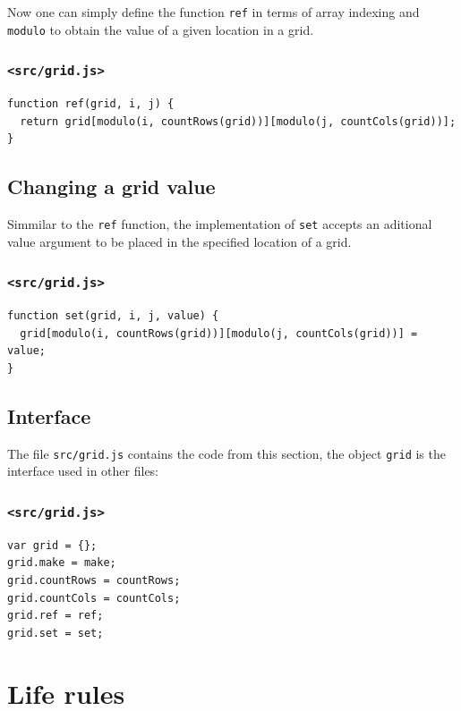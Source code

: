 \documentclass[11pt]{article}
\begin{document}
Now one can simply define the function \texttt{ref} in terms of array indexing and \texttt{modulo} to obtain the value of a given location in a grid.

\subsubsection{\texttt{<src/grid.js>}}
\label{sec:org5af4269}
\begin{verbatim}
function ref(grid, i, j) {
  return grid[modulo(i, countRows(grid))][modulo(j, countCols(grid))];
}
\end{verbatim}

\subsection{Changing a grid value}
\label{sec:org5763d39}

Simmilar to the \texttt{ref} function, the implementation of \texttt{set} accepts an aditional value argument to be placed in the specified location of a grid.

\subsubsection{\texttt{<src/grid.js>}}
\label{sec:orgbd1d8fd}
\begin{verbatim}
function set(grid, i, j, value) {
  grid[modulo(i, countRows(grid))][modulo(j, countCols(grid))] = value;
}
\end{verbatim}

\subsection{Interface}
\label{sec:org2c7beea}

The file \texttt{src/grid.js} contains the code from this section, the object \texttt{grid} is the interface used in other files:

\subsubsection{\texttt{<src/grid.js>}}
\label{sec:orgd5f9c0d}
\begin{verbatim}
var grid = {};
grid.make = make;
grid.countRows = countRows;
grid.countCols = countCols;
grid.ref = ref;
grid.set = set;
\end{verbatim}

\section{Life rules}
\label{sec:org38eb445}
\end{document}
